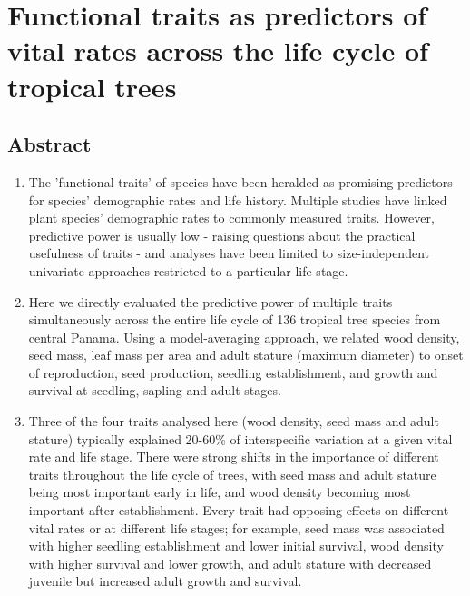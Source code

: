 \documentclass[b5paper,justified]{tufte-book} %
\begin{document}
\chapter{Functional traits as predictors of vital rates across the life cycle of tropical trees}
\label{ch5} 

\section{Abstract} 
\begin{fullwidth}
\begin{enumerate}
\item The  'functional traits' of species have been heralded as promising predictors for species' demographic rates and life history. Multiple studies have linked plant species' demographic rates to commonly measured traits. However, predictive power is usually low - raising questions about the practical usefulness of traits - and analyses have been limited to size-independent univariate approaches restricted to a particular life stage.
\item Here we directly evaluated the predictive power of multiple traits simultaneously across the entire life cycle of 136 tropical tree species from central Panama. Using a model-averaging approach, we related wood density, seed mass, leaf mass per area and adult stature (maximum diameter) to onset of reproduction, seed production, seedling establishment, and growth and survival at seedling, sapling and adult stages.
\item Three of the four traits analysed here (wood density, seed mass and adult stature) typically explained 20-60\% of interspecific variation at a given vital rate and life stage. There were strong shifts in the importance of different traits throughout the life cycle of trees, with seed mass and adult stature being most important early in life, and wood density becoming most important after establishment. Every trait had opposing effects on different vital rates or at different life stages; for example, seed mass was associated with higher seedling establishment and lower initial survival, wood density with higher survival and lower growth, and adult stature with decreased juvenile but increased adult growth and survival. 

\end{enumerate}
\end{fullwidth}
\end{document}
